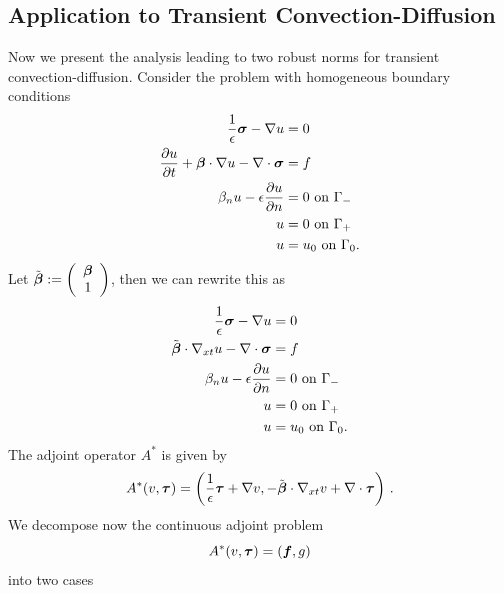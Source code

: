 \documentclass[Dissertation.tex]{subfiles}
\begin{document}
\subsection{Application to Transient Convection-Diffusion}
Now we present the analysis leading to two robust norms for transient convection-diffusion.
Consider the problem with homogeneous boundary conditions
\begin{align*}
\frac{1}{\epsilon}\boldsymbol\sigma-\nabla u &=0\\
\frac{\partial u}{\partial t} + \boldsymbol\beta\cdot\nabla u - \nabla\cdot\boldsymbol\sigma &= f\\
\beta_n u-\epsilon\frac{\partial u}{\partial n} &= 0 \text{ on } \Gamma_-\\
u &= 0 \text{ on } \Gamma_+\\
u &= u_0 \text{ on } \Gamma_0.
\end{align*}
Let $\tilde{\boldsymbol\beta}:=\left( \begin{array}{c} \boldsymbol\beta\\ 1\\ \end{array} \right)$, then we can rewrite this as
\begin{align*}
\frac{1}{\epsilon}\boldsymbol\sigma-\nabla u &=0\\
\tilde{\boldsymbol\beta}\cdot\nabla_{xt} u - \nabla\cdot\boldsymbol\sigma &= f\\
\beta_n u-\epsilon\frac{\partial u}{\partial n} &= 0 \text{ on } \Gamma_-\\
u &= 0 \text{ on } \Gamma_+\\
u &= u_0 \text{ on } \Gamma_0.
\end{align*}
The adjoint operator $A^*$ is given by 
\[
A^*(v,\boldsymbol\tau)=\left( \frac{1}{\epsilon}\boldsymbol\tau+\nabla v,-\tilde{\boldsymbol\beta}\cdot\nabla_{xt} v+\nabla\cdot\boldsymbol\tau \right)\,.
\]
We decompose now the continuous adjoint problem
\[
A^*(v,\boldsymbol\tau)=(\boldsymbol f,g)
\]
into two cases
\end{document}
